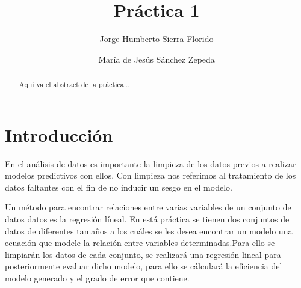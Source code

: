 \documentclass[sigconf]{acmart}
\begin{document}
\title{Práctica 1}

\author{Jorge Humberto Sierra Florido}

\author{María de Jesús Sánchez Zepeda}






\begin{abstract}
  Aqu{\'i} va el abstract de la pr{\'a}ctica...
\end{abstract}




\maketitle

\section{Introducción}

En el análisis de datos es importante la limpieza de los datos previos a realizar modelos predictivos con ellos. Con limpieza nos referimos al tratamiento de los datos faltantes con el fin de no inducir un sesgo en el modelo.

Un método para encontrar relaciones entre varias variables de un conjunto de datos datos es la regresión líneal. En está práctica se tienen dos conjuntos de datos de diferentes tamaños a los cuáles se les desea encontrar un modelo una ecuación que modele la relación entre variables determinadas.Para ello se limpiarán los datos de cada conjunto, se realizará una regresión lineal para posteriormente evaluar dicho modelo, para ello se cálculará la eficiencia del modelo generado y el grado de error que contiene.
\end{document}
